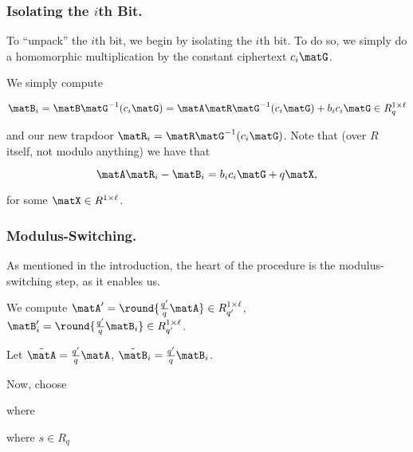 \subsubsection{Isolating the $i$th Bit.}
\label{sec:isolating-ith-bit}

To ``unpack'' the $i$th bit, we begin by isolating the $i$th bit. To
do so, we simply do a homomorphic multiplication by the constant
ciphertext $c_{i}\matG$.

We simply compute

\[\matB_i = \matB\matG^{-1}(c_{i}\matG) =
  \matA\matR\matG^{-1}(c_{i}\matG) + b_ic_i\matG \in R_q^{1 \times \ell}\]

and our new trapdoor $\matR_i = \matR\matG^{-1}(c_{i}\matG)$. Note
that (over $R$ itself, not modulo anything) we have that 

\[\matA\matR_i - \matB_i = b_ic_i\matG + q\matX,\]

for some $\matX \in R^{1 \times \ell}$. 

\subsubsection{Modulus-Switching.}
\label{sec:modulus-switching}

As  mentioned in the introduction, the heart of the
procedure is the modulus-switching step, as it enables us.


We compute $\matA' = \round{\tfrac{q'}{q}\matA} \in R_{q'}^{1 \times \ell}$, $\matB_i'
=\round{\tfrac{q'}{q}\matB_i} \in R_{q'}^{1 \times \ell}$. 

Let $\tilde{\matA} = \tfrac{q'}{q}\matA$, $\tilde{\matB}_{i} =
\tfrac{q'}{q}\matB_i$. 





Now, choose 

where 

where $s \in R_q$ 










